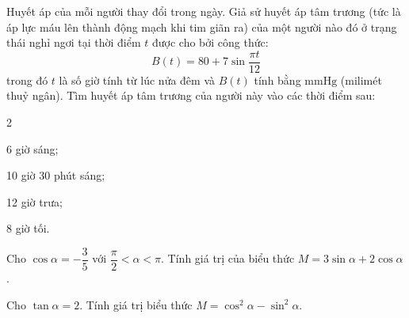 \begin{vd}
	Huyết áp của mỗi người thay đổi trong ngày. Giả sử huyết áp tâm trương (tức là áp lực máu lên thành động mạch khi tim giãn ra) của một người nào đó ở trạng thái nghỉ ngơi tại thời điểm $t$ được cho bởi công thức:
	$$
	B(t)=80+7 \sin \frac{\pi t}{12}
	$$
	trong đó $t$ là số giờ tính từ lúc nửa đêm và $B(t)$ tính bằng $\mathrm{mmHg}$ (milimét thuỷ ngân). Tìm huyết áp tâm trương của người này vào các thời điểm sau:
	\begin{enumEX}[a)]{2}
		\item 6 giờ sáng;
		\item 10 giờ 30 phút sáng;
		\item 12 giờ trưa;
		\item 8 giờ tối.
	\end{enumEX}
\end{vd} %

\begin{vd}%
	Cho $\cos \alpha=-\dfrac{3}{5}$ với $\dfrac{\pi}{2}<\alpha<\pi$. Tính giá trị của biểu thức $M=3\sin\alpha+2\cos\alpha$.
\end{vd} %

\begin{vd}%
	Cho $\tan \alpha=2$. Tính giá trị biểu thức $M=\cos^2\alpha-\sin^2\alpha$.
\end{vd} %

